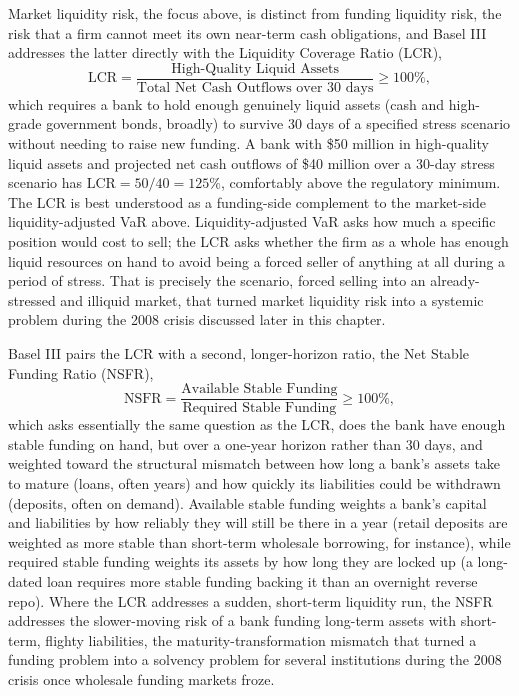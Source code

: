 \documentclass[../ai_in_finance]{subfiles}
\begin{document}
Market liquidity risk, the focus above, is distinct from funding liquidity risk, the risk that a firm cannot meet its own near-term cash obligations, and Basel III addresses the latter directly with the Liquidity Coverage Ratio (LCR),
\begin{equation*}
\text{LCR} = \frac{\text{High-Quality Liquid Assets}}{\text{Total Net Cash Outflows over 30 days}} \ge 100\%,
\end{equation*}
which requires a bank to hold enough genuinely liquid assets (cash and high-grade government bonds, broadly) to survive 30 days of a specified stress scenario without needing to raise new funding. A bank with \$50 million in high-quality liquid assets and projected net cash outflows of \$40 million over a 30-day stress scenario has $\text{LCR} = 50/40 = 125\%$, comfortably above the regulatory minimum.
The LCR is best understood as a funding-side complement to the market-side liquidity-adjusted VaR above. Liquidity-adjusted VaR asks how much a specific position would cost to sell; the LCR asks whether the firm as a whole has enough liquid resources on hand to avoid being a forced seller of anything at all during a period of stress. That is precisely the scenario, forced selling into an already-stressed and illiquid market, that turned market liquidity risk into a systemic problem during the 2008 crisis discussed later in this chapter.

Basel III pairs the LCR with a second, longer-horizon ratio, the Net Stable Funding Ratio (NSFR),
\begin{equation*}
\text{NSFR} = \frac{\text{Available Stable Funding}}{\text{Required Stable Funding}} \ge 100\%,
\end{equation*}
which asks essentially the same question as the LCR, does the bank have enough stable funding on hand, but over a one-year horizon rather than 30 days, and weighted toward the structural mismatch between how long a bank's assets take to mature (loans, often years) and how quickly its liabilities could be withdrawn (deposits, often on demand).
Available stable funding weights a bank's capital and liabilities by how reliably they will still be there in a year (retail deposits are weighted as more stable than short-term wholesale borrowing, for instance), while required stable funding weights its assets by how long they are locked up (a long-dated loan requires more stable funding backing it than an overnight reverse repo).
Where the LCR addresses a sudden, short-term liquidity run, the NSFR addresses the slower-moving risk of a bank funding long-term assets with short-term, flighty liabilities, the maturity-transformation mismatch that turned a funding problem into a solvency problem for several institutions during the 2008 crisis once wholesale funding markets froze.
\end{document}
